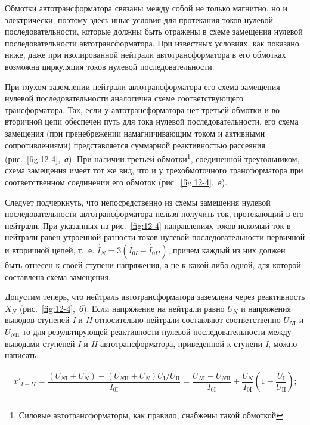Обмотки автотрансформатора связаны между собой не только магнитно, но и электрически; поэтому здесь иные условия для протекания токов нулевой последовательности, которые должны быть отражены в схеме замещения нулевой последовательности автотрансформатора. При известных условиях, как показано ниже, даже при изолированной нейтрали автотрансформатора в его обмотках возможна циркуляция токов нулевой последовательности.

При глухом заземлении нейтрали автотрансформатора его схема замещения нулевой последовательности аналогична схеме соответствующего трансформатора. Так, если у автотрансформатора нет третьей обмотки и во вторичной цепи обеспечен путь для тока нулевой последовательности, его схема замещения (при пренебрежении намагничивающим током и активными сопротивлениями) представляется суммарной реактивностью рассеяния (рис.~\ref{fig:12-4},~\textit{а}). При наличии третьей обмотки\footnote{Силовые автотрансформаторы, как правило, снабжены такой обмоткой}, соединенной треугольником, схема замещения имеет тот же вид, что и у трехобмоточного трансформатора при соответственном соединении его обмоток (рис.~\ref{fig:12-4},~\textit{в}).

Следует подчеркнуть, что непосредственно из схемы замещения нулевой последовательности автотрансформатора нельзя получить ток, протекающий в его нейтрали. При указанных на рис.~\ref{fig:12-4} направлениях токов искомый ток в нейтрали равен утроенной разности токов нулевой последовательности первичной и вторичной цепей, т.~е. $ \overset{~\cdot}{I}_N = 3( \overset{~\cdot}{I}_{0I} - \overset{~\cdot}{I}_{0II}) $, причем каждый из них должен быть отнесен к своей ступени напряжения, а не к какой-либо одной, для которой составлена схема замещения.


Допустим теперь, что нейтраль автотрансформатора заземлена через реактивность $ X_N $ (рис.~\ref{fig:12-4},~\textit{б}). Если напряжение на нейтрали равно $ U_N $ и напряжения выводов ступеней \textit{I} и \textit{II} относительно нейтрали составляют соответственно $ U_{N\text{I}} $ и $ U_{N\text{II}} $ то для результирующей реактивности нулевой последовательности между выводами ступеней \textit{I} и \textit{II} автотрансформатора, приведенной к ступени \textit{I}, можно написать:

\begin{equation*}
	x'_{I-II} = \frac{( U_{N\text{I}} + U_N ) - ( U_{N\text{II}} + U_N ) U_{\text{I}} / U_{\text{II}} }{I_{0\text{I}}} = \frac{ U_{N\text{I}} - \overset{\circ }{U}_{N\text{II}} }{ I_{0\text{I}} } + \frac{U_N}{I_{0\text{I}}}\left ( 1- \frac{U_{\text{I}}}{U_{\text{II}}} \right ) \text{;}
\end{equation*}

